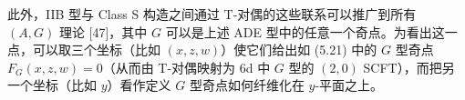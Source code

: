 

此外，IIB 型与 Class S 构造之间通过 T-对偶的这些联系可以推广到所有 $(A,G)$ 理论 [47]，其中 $G$ 可以是上述 ADE 型中的任意一个奇点。为看出这一点，可以取三个坐标（比如 $(x,z,w)$）使它们给出如 (5.21) 中的 $G$ 型奇点 $F_G(x,z,w)=0$（从而由 T-对偶映射为 6d 中 $G$ 型的 $(2,0)$ SCFT），而把另一个坐标（比如 $y$）看作定义 $G$ 型奇点如何纤维化在 $y$-平面之上。


